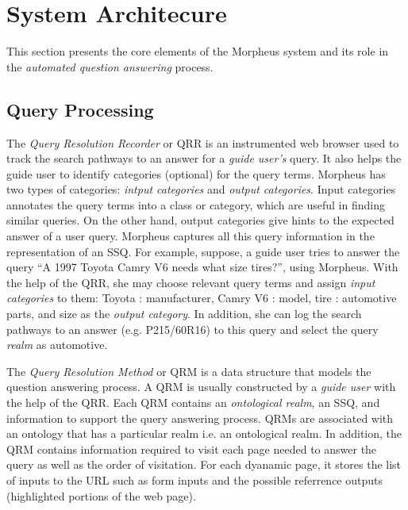 \section{System Architecure}
\label{sec:systemarch}

This section presents the core elements of the Morpheus system and its 
role in the \textit{automated question answering} process. 

\subsection{Query Processing}
\label{sec:query_processing}
  
The \emph{Query Resolution Recorder} or QRR is an instrumented web browser
used to track the search pathways to an answer for a \textit{guide user's} query. It
also helps the guide user to identify categories (optional) for the query terms. 
Morpheus has two types of categories: \emph{intput categories} and \emph{output categories}.
Input categories annotates the query terms into a class or category, which are 
useful in finding similar queries. On the other hand, output categories give hints
to the expected answer of a user query. Morpheus captures all
this query information in the representation of an SSQ. For example, suppose, a guide user
tries to answer the query ``A 1997 Toyota Camry V6 needs what size tires?'', using
Morpheus. With the help of the QRR, she may choose relevant query terms and assign
\emph{input categories} to them: Toyota : manufacturer, Camry V6 : 
model, tire : automotive parts, and size as the \emph{output category}. 
In addition, she can log the search pathways to an answer (e.g. P215/60R16)
to this query and select the query \emph{realm} as automotive.      


The \emph{Query Resolution Method} or QRM is a data structure that models the
question answering process. A QRM is usually constructed by a \emph{guide user} with
the help of the QRR. Each QRM contains an \emph{ontological realm}, an SSQ, and
information to support the query answering process. QRMs are associated with an
ontology that has a particular realm i.e. an ontological realm. In addition, 
the QRM contains information required to visit each page needed to 
answer the query as well as the order of visitation. For each
dyanamic page, it stores the list of inputs to the URL such as form inputs and
the possible referrence outputs (highlighted portions of the web page).



